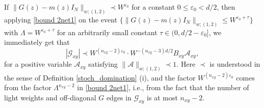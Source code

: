\documentclass{article}
\newcommand{\1}{\mathds{1}}
\numberwithin{equation}{section}
\newcommand{\ord}{{\rm{ord}}}
\newcommand{\be}{\begin{equation}}
\newcommand{\ee}{\end{equation}}
\newcommand{\e}{{\varepsilon}}
\renewcommand{\cal}{\mathcal}
\renewcommand{\leq}{\leqslant}
\renewcommand{\le}{\leq}
\theoremstyle{plain} %
\newtheorem{corollary}[theorem]{Corollary}
\theoremstyle{remark}
\begin{document}
%
%



If $\|G(z)-m(z)I_N\|_{w;(1,2)} \prec W^{\e_0} $ for a constant $0\le \e_0< d/2$, then applying \eqref{bound 2net1} on the event $\{\|G(z)-m(z)I_N\|_{w;(1,2)}\le W^{\e_0+\tau}\}$ with $\Lambda=W^{\e_0+\tau}$ for an arbitrarily small constant $\tau\in (0, d/2-\e_0]$, we immediately get that %
\be\label{bound 2net1 cor}
\left|\cal G_{xy}\right| \prec W^{(n_{xy}-2)\e_0}\cdot  W^{ -  \left(n_{xy}-3\right)d/2} B_{xy} \cal A_{xy},
\ee
for a positive variable $\cal A_{xy}$ satisfying $\|\cal A\|_{w;(1,2)}\prec 1$. %
Here $\prec$ is understood in the sense of Definition \ref{stoch_domination} (i), and the factor $W^{(n_{xy}-2)\e_0}$ comes from the factor $\Lambda^{n_{xy}-2}$ in \eqref{bound 2net1}, i.e., from the fact that the number of light weights and off-diagonal $G$ edges in $\cal G_{xy}$ is at most $n_{xy} -2$.
\end{document}
